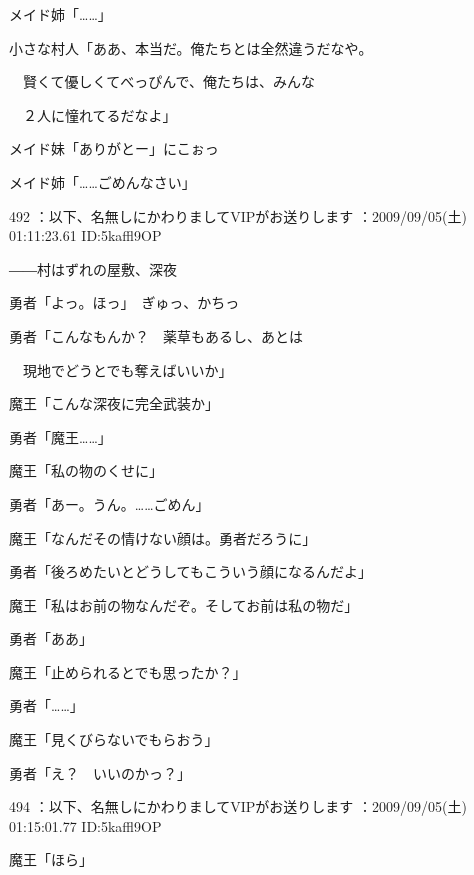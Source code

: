 \documentclass[a4j,twocolumn]{tarticle}
\begin{document}
メイド姉「……」 



小さな村人「ああ、本当だ。俺たちとは全然違うだなや。\par{} 
　賢くて優しくてべっぴんで、俺たちは、みんな\par{} 
　２人に憧れてるだなよ」



メイド妹「ありがとー」にこぉっ\par{} 
メイド姉「……ごめんなさい」 

	
    
    

492 ：以下、名無しにかわりましてVIPがお送りします ：2009/09/05(土) 01:11:23.61 ID:5kaffl9OP 


――村はずれの屋敷、深夜 



勇者「よっ。ほっ」　ぎゅっ、かちっ\par{} 
勇者「こんなもんか？　薬草もあるし、あとは\par{} 
　現地でどうとでも奪えばいいか」 



魔王「こんな深夜に完全武装か」\par{} 
勇者「魔王……」 



魔王「私の物のくせに」\par{} 
勇者「あー。うん。……ごめん」 



魔王「なんだその情けない顔は。勇者だろうに」\par{} 
勇者「後ろめたいとどうしてもこういう顔になるんだよ」 



魔王「私はお前の物なんだぞ。そしてお前は私の物だ」\par{} 
勇者「ああ」 



魔王「止められるとでも思ったか？」\par{} 
勇者「……」 



魔王「見くびらないでもらおう」\par{} 
勇者「え？　いいのかっ？」

	
    
    

494 ：以下、名無しにかわりましてVIPがお送りします ：2009/09/05(土) 01:15:01.77 ID:5kaffl9OP 


魔王「ほら」 
\end{document}
